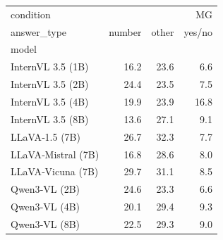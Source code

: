 \begin{tabular}{lrrr}
\toprule
condition & \multicolumn{3}{r}{MG} \\
answer_type & number & other & yes/no \\
model &  &  &  \\
\midrule
InternVL 3.5 (1B) & 16.2 & 23.6 & 6.6 \\
InternVL 3.5 (2B) & 24.4 & 23.5 & 7.5 \\
InternVL 3.5 (4B) & 19.9 & 23.9 & 16.8 \\
InternVL 3.5 (8B) & 13.6 & 27.1 & 9.1 \\
LLaVA‑1.5 (7B) & 26.7 & 32.3 & 7.7 \\
LLaVA‑Mistral (7B) & 16.8 & 28.6 & 8.0 \\
LLaVA‑Vicuna (7B) & 29.7 & 31.1 & 8.5 \\
Qwen3‑VL (2B) & 24.6 & 23.3 & 6.6 \\
Qwen3‑VL (4B) & 20.1 & 29.4 & 9.3 \\
Qwen3‑VL (8B) & 22.5 & 29.3 & 9.0 \\
\bottomrule
\end{tabular}
